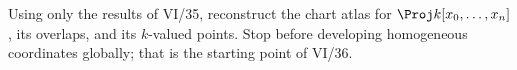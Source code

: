 \begin{problem}\label{chal:vi35-05}
Using only the results of VI/35, reconstruct the chart atlas for \(\Proj k[x_0,\ldots,x_n]\), its overlaps, and its \(k\)-valued points. Stop before developing homogeneous coordinates globally; that is the starting point of VI/36.
\end{problem}
